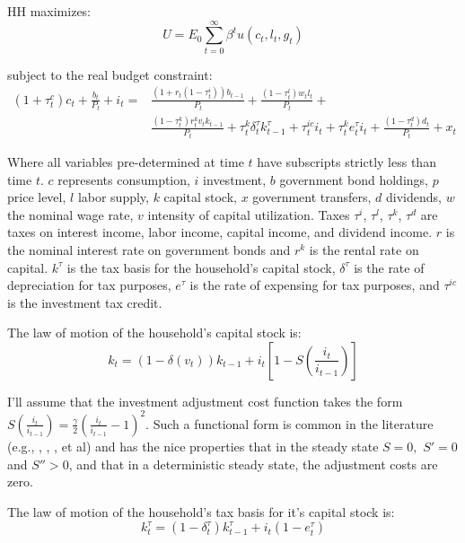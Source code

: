 \documentclass[article,11pt,letterpaper,fleqn]{article}
\theoremstyle{definition}
\numberwithin{equation}{section}
\newcommand{\cn}{\citeasnoun} %
\begin{document}
HH maximizes:
\begin{equation}
U=E_{0}\sum_{t=0}^{\infty}\beta^{t}u(c_{t},l_{t},g_{t})
\end{equation}

subject to the real budget constraint:
\begin{equation}
\begin{split}
(1+\tau_{t}^{c})c_{t}+\frac{b_{t}}{P_{t}}+i_{t}= & \frac{(1+r_{t}(1-\tau_{t}^{i}))b_{t-1}}{P_{t}} + \frac{(1-\tau_{t}^{l})w_{t}l_{t}}{P_{t}} + \\
& \frac{(1-\tau_{t}^{k})r_{t}^{k}v_{t}k_{t-1}}{P_{t}} + \tau_{t}^{k}\delta_{t}^{\tau}k_{t-1}^{\tau} + \tau_{t}^{ic}i_{t} + \tau_{t}^{k}e_{t}^{\tau}i_{t} +  \frac{(1-\tau_{t}^{d})d_{t}}{P_{t}} + x_{t}
\end{split}
\end{equation}

\noindent\noindent Where all variables pre-determined at time $t$ have subscripts strictly less than time $t$.  $c$ represents consumption, $i$ investment, $b$ government bond holdings, $p$ price level, $l$ labor supply, $k$ capital stock, $x$ government transfers, $d$ dividends, $w$ the nominal wage rate, $v$ intensity of capital utilization. Taxes $\tau^{i}$, $\tau^{l}$, $\tau^{k}$, $\tau^{d}$ are taxes on interest income, labor income, capital income, and dividend income.  $r$ is the nominal interest rate on government bonds and $r^{k}$ is the rental rate on capital.  $k^{\tau}$ is the tax basis for the household's capital stock, $\delta^{\tau}$ is the rate of depreciation for tax purposes, $e^{\tau}$ is the rate of expensing for tax purposes, and $\tau^{ic}$ is the investment tax credit.


The law of motion of the household's capital stock is:
\begin{equation}
k_{t}=(1-\delta(v_{t}))k_{t-1} + i_{t}\left[1-S\left(\frac{i_{t}}{i_{t-1}}\right)\right]
\end{equation}

I'll assume that the investment adjustment cost function takes the form $S\left(\frac{i_{t}}{i_{t-1}}\right)=\frac{\gamma}{2}\left(\frac{i_{t}}{i_{t-1}}-1\right)^2$.  Such a functional form is common in the literature (e.g., \cn{SW2003}, \cn{CER2010}, \cn{Zubairy2010}, et al) and has the nice properties that in the steady state $S=0,$ $S'=0$ and $S''>0$, and that in a deterministic steady state, the adjustment costs are zero.

The law of motion of the household's tax basis for it's capital stock is:
\begin{equation}
k_{t}^{\tau}=(1-\delta_{t}^{\tau})k_{t-1}^{\tau} + i_{t}(1-e_{t}^{\tau})
\end{equation}
\end{document}

